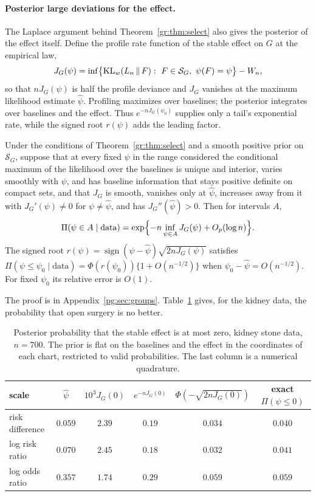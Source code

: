 \paragraph{Posterior large deviations for the effect.}
The Laplace argument behind Theorem~\ref{gr:thm:select} also gives the posterior of the effect itself. Define the profile rate function of the stable effect on $G$ at the empirical law,
\[
J_G(\psi)=\inf\bigl\{\KL_w(L_n\,\|\,F):\ F\in\mathcal S_G,\ \psi(F)=\psi\bigr\}-W_n,
\]
so that $nJ_G(\psi)$ is half the profile deviance and $J_G$ vanishes at the maximum likelihood estimate $\hat\psi$. Profiling maximizes over baselines; the posterior integrates over baselines and the effect. Thus $e^{-nJ_G(\psi_0)}$ supplies only a tail's exponential rate, while the signed root $r(\psi)$ adds the leading factor.

\begin{proposition}\label{gr:prop:effect}
Under the conditions of Theorem~\ref{gr:thm:select} and a smooth positive prior on $\mathcal S_G$, suppose that at every fixed $\psi$ in the range considered the conditional maximum of the likelihood over the baselines is unique and interior, varies smoothly with $\psi$, and has baseline information that stays positive definite on compact sets, and that $J_G$ is smooth, vanishes only at $\hat\psi$, increases away from it with $J_G'(\psi)\neq0$ for $\psi\neq\hat\psi$, and has $J_G''(\hat\psi)>0$. Then for intervals $A$,
\[
\Pi(\psi\in A\mid\text{data})=\exp\Bigl\{-n\inf_{\psi\in A}J_G(\psi)+O_p(\log n)\Bigr\}.
\]
The signed root $r(\psi)=\operatorname{sign}(\psi-\hat\psi)\sqrt{2nJ_G(\psi)}$ satisfies $\Pi(\psi\le\psi_0\mid\text{data})=\Phi(r(\psi_0))\{1+O(n^{-1/2})\}$ when $\psi_0-\hat\psi=O(n^{-1/2})$. For fixed $\psi_0$ its relative error is $O(1)$.
\end{proposition}

The proof is in Appendix~\ref{pg:sec:groups}. Table~\ref{gr:tab:profile} gives, for the kidney data, the probability that open surgery is no better.

\begin{table}[ht]
\centering\small\setlength{\tabcolsep}{4pt}
\caption{Posterior probability that the stable effect is at most zero, kidney stone data, $n=700$. The prior is flat on the baselines and the effect in the coordinates of each chart, restricted to valid probabilities. The last column is a numerical quadrature.}
\label{gr:tab:profile}
\begin{tabular}{@{}lccccc@{}}
\toprule
scale & $\hat\psi$ & $10^3J_G(0)$ & $e^{-nJ_G(0)}$ & $\Phi(-\sqrt{2nJ_G(0)})$ & exact $\Pi(\psi\le0)$ \\
\midrule
risk difference & $0.059$ & $2.39$ & $0.19$ & $0.034$ & $0.040$ \\
log risk ratio & $0.070$ & $2.45$ & $0.18$ & $0.032$ & $0.041$ \\
log odds ratio & $0.357$ & $1.74$ & $0.29$ & $0.059$ & $0.059$ \\
\bottomrule
\end{tabular}
\end{table}

